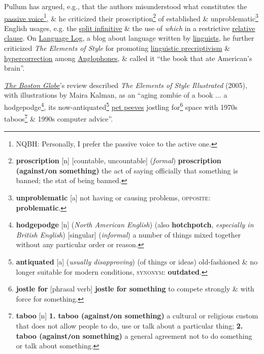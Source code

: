 \documentclass{article}
\begin{document}
Pullum has argued, e.g., that the authors misunderstood what constitutes the \href{https://en.wikipedia.org/wiki/English_passive_voice}{passive voice}\footnote{NQBH: Personally, I prefer the passive voice to the active one.}, \& he criticized their proscription\footnote{{\bf proscription} [n] [countable, uncountable] ({\it formal}) {\bf proscription (against{\tt/}on something)} the act of saying officially that something is banned; the stat of being banned.} of established \& unproblematic\footnote{{\bf unproblematic} [a] not having or causing problems, \textsc{opposite}: {\bf problematic}.} English usages, e.g. the \href{https://en.wikipedia.org/wiki/Split_infinitive}{split infinitive} \& the use of {\it which} in a restrictive \href{https://en.wikipedia.org/wiki/English_relative_clause#That_or_which}{relative clause}. On \href{https://en.wikipedia.org/wiki/Language_Log}{Language Log}, a blog about language written by \href{https://en.wikipedia.org/wiki/Linguists}{linguists}, he further criticized {\it The Elements of Style} for promoting \href{https://en.wikipedia.org/wiki/Linguistic_prescriptivism}{linguistic precriptivism} \& \href{https://en.wikipedia.org/wiki/Hypercorrection}{hypercorrection} among \href{https://en.wikipedia.org/wiki/Anglophones}{Anglophones}, \& called it ``the book that ate American's brain''.

\href{https://en.wikipedia.org/wiki/The_Boston_Globe}{{\it The Boston Globe}}'s review described {\it The Elements of Style Illustrated} (2005), with illustrations by Maira Kalman, as an ``aging zombie of a book $\ldots$ a hodgepodge\footnote{{\bf hodgepodge} [n] ({\it North American English}) (also {\bf hotchpotch}, {\it especially in British English}) [singular] ({\it informal}) a number of things mixed together without any particular order or reason.}, its now-antiquated\footnote{{\bf antiquated} [a] ({\it usually disapproving}) (of things or ideas) old-fashioned \& no longer suitable for modern conditions, \textsc{synonym}: {\bf outdated}.} \href{https://en.wikipedia.org/wiki/Pet_peeve}{pet peeves} jostling for\footnote{{\bf jostle for} [phrasal verb] {\bf jostle for something} to compete strongly \& with force for something.} space with 1970s taboos\footnote{{\bf taboo} [n] {\bf 1. taboo (against{\tt/}on something)} a cultural or religious custom that does not allow people to do, use or talk about a particular thing; {\bf 2. taboo (against{\tt/}on something)} a general agreement not to do something or talk about something.} \& 1990s computer advice''.
\end{document}
